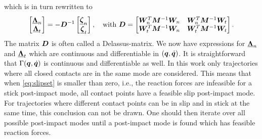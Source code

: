 \documentclass[../DC2017114Bouma.tex]{subfiles}
\begin{document}
which is in turn rewritten to
\begin{align}
\begin{bmatrix}
\underline{\boldsymbol{\Lambda}}_{n}\\
\underline{\boldsymbol{\Lambda}}_{t}
\end{bmatrix} = - {\boldsymbol{D}}^{-1}\begin{bmatrix}
\underline{\boldsymbol{\zeta}}_{n}\\
\underline{\boldsymbol{\zeta}}_{t}
\end{bmatrix},\quad \text{with } {\boldsymbol{D}} = \begin{bmatrix}
{\boldsymbol{W}}_{n}^T{\boldsymbol{M}}^{-1}{\boldsymbol{W}}_{n} & {\boldsymbol{W}}_{n}^T{\boldsymbol{M}}^{-1}{\boldsymbol{W}}_{t}\\
{\boldsymbol{W}}_{t}^T{\boldsymbol{M}}^{-1}{\boldsymbol{W}}_{n} & {\boldsymbol{W}}_{t}^T{\boldsymbol{M}}^{-1}{\boldsymbol{W}}_{t}
\end{bmatrix}.
\end{align}
The matrix ${\boldsymbol{D}}$ is often called a Delassus-matrix. We now have expressions for $\underline{\boldsymbol{\Lambda}}_{n}$ and $\underline{\boldsymbol{\Lambda}}_{t}$ which are continuous and differentiable in $({\boldsymbol{q}},\dot{{\boldsymbol{q}}})$. It is straightforward that $\Gamma({\boldsymbol{q}},\dot{{\boldsymbol{q}}})$ is continuous and differentiable as well. In this work only trajectories where all closed contacts are in the same mode are considered. This means that when \eqref{eq:slipset} is smaller than zero, i.e., the reaction forces are infeasible for a stick post-impact mode, all contact points have a feasible slip post-impact mode. For trajectories where different contact points can be in slip and in stick at the same time, this conclusion can not be drawn. One should then iterate over all possible post-impact modes until a post-impact mode is found which has feasible reaction forces.
\end{document}
